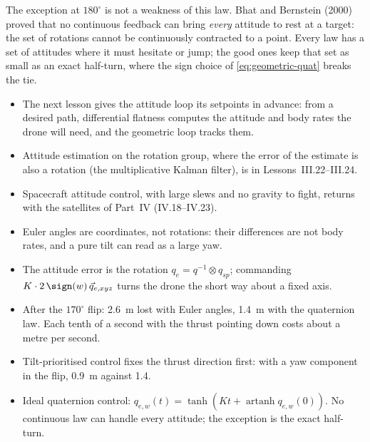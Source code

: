 The exception at $180^\circ$ is not a weakness of this law. Bhat and Bernstein (2000) proved that no continuous feedback can bring \emph{every} attitude to rest at a target: the set of rotations cannot be continuously contracted to a point. Every law has a set of attitudes where it must hesitate or jump; the good ones keep that set as small as an exact half-turn, where the sign choice of \cref{eq:geometric-quat} breaks the tie.

\begin{lookahead}
\begin{itemize}[leftmargin=1.2em]
  \item The next lesson gives the attitude loop its setpoints in advance: from a desired path, differential flatness computes the attitude and body rates the drone will need, and the geometric loop tracks them.
  \item Attitude estimation on the rotation group, where the error of the estimate is also a rotation (the multiplicative Kalman filter), is in Lessons~III.22--III.24.
  \item Spacecraft attitude control, with large slews and no gravity to fight, returns with the satellites of Part~IV (IV.18--IV.23).
\end{itemize}
\end{lookahead}

\begin{remember}
\begin{itemize}
  \item Euler angles are coordinates, not rotations: their differences are not body rates, and a pure tilt can read as a large yaw.
  \item The attitude error is the rotation $q_e = q^{-1} \otimes q_{sp}$; commanding $K\cdot 2\,\sign(w)\,\vec q_{e,xyz}$ turns the drone the short way about a fixed axis.
  \item After the $170^\circ$ flip: \SI{2.6}{m} lost with Euler angles, \SI{1.4}{m} with the quaternion law. Each tenth of a second with the thrust pointing down costs about a metre per second.
  \item Tilt-prioritised control fixes the thrust direction first: with a yaw component in the flip, \SI{0.9}{m} against 1.4.
  \item Ideal quaternion control: $q_{e,w}(t) = \tanh(Kt + \operatorname{artanh} q_{e,w}(0))$. No continuous law can handle every attitude; the exception is the exact half-turn.
\end{itemize}
\end{remember}

